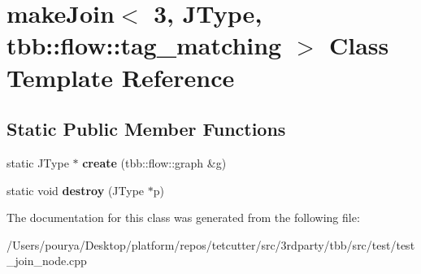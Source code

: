 \hypertarget{classmakeJoin_3_013_00_01JType_00_01tbb_1_1flow_1_1tag__matching_01_4}{}\section{make\+Join$<$ 3, J\+Type, tbb\+:\+:flow\+:\+:tag\+\_\+matching $>$ Class Template Reference}
\label{classmakeJoin_3_013_00_01JType_00_01tbb_1_1flow_1_1tag__matching_01_4}
\subsection*{Static Public Member Functions}
\begin{DoxyCompactItemize}
\item 
\hypertarget{classmakeJoin_3_013_00_01JType_00_01tbb_1_1flow_1_1tag__matching_01_4_a0550bc6b0bc966525e90f9240011fc7f}{}static J\+Type $\ast$ {\bfseries create} (tbb\+::flow\+::graph \&g)\label{classmakeJoin_3_013_00_01JType_00_01tbb_1_1flow_1_1tag__matching_01_4_a0550bc6b0bc966525e90f9240011fc7f}

\item 
\hypertarget{classmakeJoin_3_013_00_01JType_00_01tbb_1_1flow_1_1tag__matching_01_4_a372f8589b297e78b697eadad52631fce}{}static void {\bfseries destroy} (J\+Type $\ast$p)\label{classmakeJoin_3_013_00_01JType_00_01tbb_1_1flow_1_1tag__matching_01_4_a372f8589b297e78b697eadad52631fce}

\end{DoxyCompactItemize}


The documentation for this class was generated from the following file\+:\begin{DoxyCompactItemize}
\item 
/\+Users/pourya/\+Desktop/platform/repos/tetcutter/src/3rdparty/tbb/src/test/test\+\_\+join\+\_\+node.\+cpp\end{DoxyCompactItemize}
